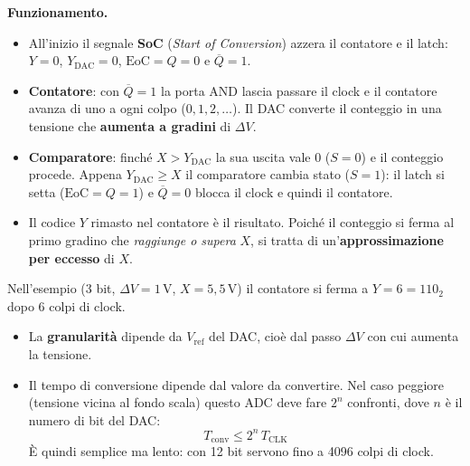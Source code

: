 \noindent\textbf{Funzionamento.}
\begin{itemize}[leftmargin=1.5em, itemsep=2pt]
    \item All'inizio il segnale \textbf{SoC} (\emph{Start of Conversion}) azzera il contatore
          e il latch: $Y=0$, $Y_{\text{DAC}}=0$, $\text{EoC}=Q=0$ e $\overline{Q}=1$.
    \item \textbf{Contatore}: con $\overline{Q}=1$ la porta AND lascia passare il clock e il
          contatore avanza di uno a ogni colpo ($0, 1, 2, \ldots$). Il DAC converte il
          conteggio in una tensione che \textbf{aumenta a gradini} di $\Delta V$.
    \item \textbf{Comparatore}: finché $X > Y_{\text{DAC}}$ la sua uscita vale 0 ($S=0$) e il
          conteggio procede. Appena $Y_{\text{DAC}} \geq X$ il comparatore cambia stato
          ($S=1$): il latch si setta ($\text{EoC}=Q=1$) e $\overline{Q}=0$ blocca il clock e
          quindi il contatore.
    \item Il codice $Y$ rimasto nel contatore è il risultato. Poiché il conteggio si ferma
          al primo gradino che \emph{raggiunge o supera} $X$, si tratta di
          un'\textbf{approssimazione per eccesso} di $X$.
\end{itemize}

\begin{center}
\end{center}

\noindent Nell'esempio (3 bit, $\Delta V = 1$\,V, $X=5{,}5$\,V) il contatore si ferma a
$Y = 6 = 110_2$ dopo 6 colpi di clock.

\begin{itemize}[leftmargin=1.5em, itemsep=2pt]
    \item La \textbf{granularità} dipende da $V_{\text{ref}}$ del DAC, cioè dal passo
          $\Delta V$ con cui aumenta la tensione.
    \item Il tempo di conversione dipende dal valore da convertire. Nel caso peggiore
          (tensione vicina al fondo scala) questo ADC deve fare $2^n$ confronti, dove $n$ è
          il numero di bit del DAC:
          \[
          T_{\text{conv}} \le 2^{n}\, T_{\text{CLK}}
          \]
          È quindi semplice ma lento: con 12 bit servono fino a 4096 colpi di clock.
\end{itemize}

